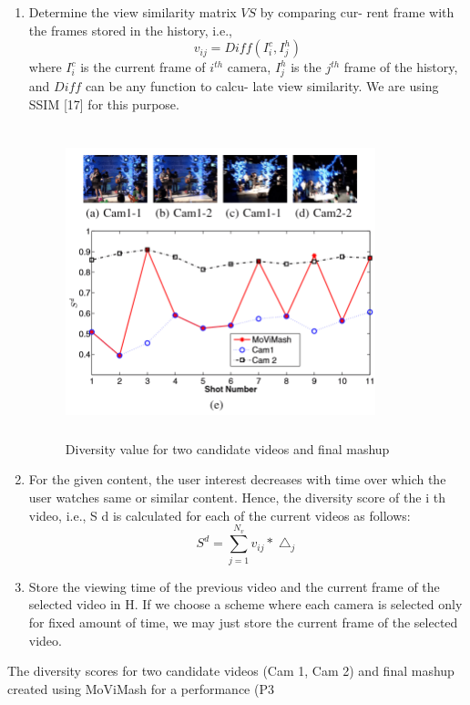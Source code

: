 \documentclass{clsfile}
\begin{document}
\begin{enumerate}
\item Determine the view similarity matrix $V S$ by comparing cur-
rent frame with the frames stored in the history, i.e.,
\begin{equation}
    v_{ij} = Diff(I^c_i,I^h_j)
\end{equation}
where $I_i^c$ is the current frame of $i^{th}$ camera, $I_j^h$ is the $j^{th}$
frame of the history, and $Diff$ can be any function to calcu-
late view similarity. We are using SSIM [17] for this purpose.
\begin{figure}
\includegraphics[width=9cm, height=9cm]{fig5.png}
   \caption{Diversity value for two candidate videos and ﬁnal mashup
}
\end{figure}
\item For the given content, the user interest decreases with time
over which the user watches same or similar content. Hence,
the diversity score of the i th video, i.e., S d is calculated for
each of the current videos as follows:
\begin{equation}
    S^d = \sum_{j=1}^{N_v}v_{ij}* \bigtriangleup_j
\end{equation}

\item Store the viewing time of the previous video and the current
frame of the selected video in H. If we choose a scheme
where each camera is selected only for fixed amount of time,
we may just store the current frame of the selected video.


\end{enumerate}
The diversity scores for two candidate videos (Cam 1, Cam 2)
and final mashup created using MoViMash for a performance (P3
\end{document}
